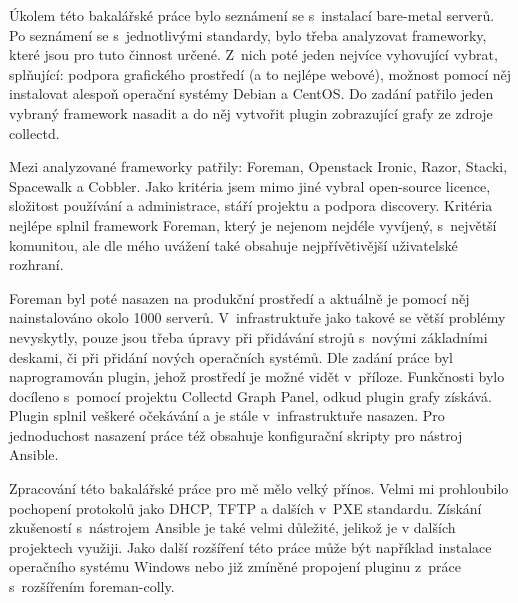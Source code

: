 


\begin{conclusion}

Úkolem této bakalářské práce bylo seznámení se s~instalací bare-metal serverů. Po seznámení se s~jednotlivými standardy, bylo třeba analyzovat frameworky, které jsou pro tuto činnost určené. Z~nich poté jeden nejvíce vyhovující vybrat, splňující: podpora grafického prostředí (a to nejlépe webové), možnost pomocí něj instalovat alespoň operační systémy Debian a CentOS. Do zadání patřilo jeden vybraný framework nasadit a do něj vytvořit plugin zobrazující grafy ze zdroje collectd.

Mezi analyzované frameworky patřily: Foreman, Openstack Ironic, Razor, Stacki, Spacewalk a Cobbler. Jako kritéria jsem mimo jiné vybral open-source licence, složitost používání a administrace, stáří projektu a podpora discovery. Kritéria nejlépe splnil framework Foreman, který je nejenom nejdéle vyvíjený, s~největší komunitou, ale dle mého uvážení také obsahuje nejpřívětivější uživatelské rozhraní.

Foreman byl poté nasazen na produkční prostředí a aktuálně je pomocí něj nainstalováno okolo 1000 serverů. V~infrastruktuře jako takové se větší problémy nevyskytly, pouze jsou třeba úpravy při přidávání strojů s~novými základními deskami, či při přidání nových operačních systémů. Dle zadání práce byl naprogramován plugin, jehož prostředí je možné vidět v~příloze. Funkčnosti bylo docíleno s~pomocí projektu Collectd Graph Panel, odkud plugin grafy získává. Plugin splnil veškeré očekávání a je stále v~infrastruktuře nasazen. Pro jednoduchost nasazení práce též obsahuje konfigurační skripty pro nástroj Ansible.

Zpracování této bakalářské práce pro mě mělo velký přínos. Velmi mi prohloubilo pochopení protokolů jako DHCP, TFTP a dalších v~PXE standardu. Získání zkušeností s~nástrojem Ansible je také velmi důležité, jelikož je v dalších projektech využiji. Jako další rozšíření této práce může být například instalace operačního systému Windows nebo již zmíněné propojení pluginu z~práce s~rozšířením foreman-colly.



\end{conclusion}
